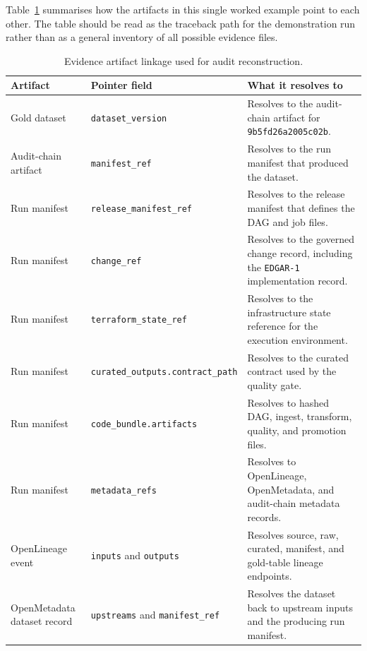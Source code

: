 Table~\ref{tab:results-artifact-linkage} summarises how the artifacts in this
single worked example point to each other. The table should be read as the
traceback path for the demonstration run rather than as a general inventory of
all possible evidence files.

\begin{table}[H]
  \centering
  \caption{Evidence artifact linkage used for audit reconstruction.}
  \label{tab:results-artifact-linkage}
  \renewcommand{\arraystretch}{1.15}
  \begin{tabularx}{\textwidth}{@{}p{}p{}X@{}}
    \toprule
    \textbf{Artifact} & \textbf{Pointer field} & \textbf{What it resolves to} \\
    \midrule
    Gold dataset & \texttt{dataset\_version} & Resolves to the audit-chain artifact for \texttt{9b5fd26a2005c02b}. \\
    Audit-chain artifact & \texttt{manifest\_ref} & Resolves to the run manifest that produced the dataset. \\
    Run manifest & \texttt{release\_manifest\_ref} & Resolves to the release manifest that defines the DAG and job files. \\
    Run manifest & \texttt{change\_ref} & Resolves to the governed change record, including the \texttt{EDGAR-1} implementation record. \\
    Run manifest & \texttt{terraform\_state\_ref} & Resolves to the infrastructure state reference for the execution environment. \\
    Run manifest & \texttt{curated\_outputs.contract\_path} & Resolves to the curated contract used by the quality gate. \\
    Run manifest & \texttt{code\_bundle.artifacts} & Resolves to hashed DAG, ingest, transform, quality, and promotion files. \\
    Run manifest & \texttt{metadata\_refs} & Resolves to OpenLineage, OpenMetadata, and audit-chain metadata records. \\
    OpenLineage event & \texttt{inputs} and \texttt{outputs} & Resolves source, raw, curated, manifest, and gold-table lineage endpoints. \\
    OpenMetadata dataset record & \texttt{upstreams} and \texttt{manifest\_ref} & Resolves the dataset back to upstream inputs and the producing run manifest. \\
    \bottomrule
  \end{tabularx}
\end{table}

